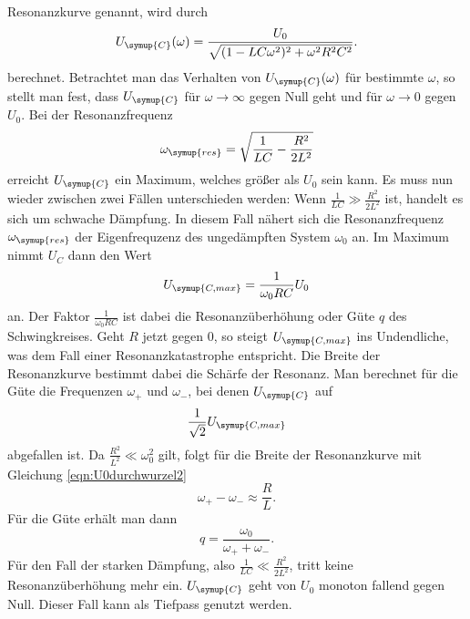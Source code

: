 Resonanzkurve genannt, wird durch
\begin{equation}
  U_\symup{C}(\omega) = \frac{U_0}{\sqrt{(1-L C \omega^2)^2 + \omega^2 R^2 C^2}}.
  \label{eqn:resonanzkurve}
\end{equation}
berechnet. Betrachtet man das Verhalten von $U_\symup{C}(\omega)$ für bestimmte
$\omega$, so stellt man fest, dass $U_\symup{C}$ für $\omega \to \infty$ gegen
Null geht und für $\omega \to 0$ gegen $U_0$. Bei der Resonanzfrequenz
\begin{equation}
  \omega_\symup{res} = \sqrt{\frac{1}{L C}-\frac{R^2}{2L^2}}
  \label{eqn:resonanzfrequenz}
\end{equation}
erreicht $U_\symup{C}$ ein Maximum, welches größer als $U_0$ sein kann.
Es muss nun wieder zwischen zwei Fällen unterschieden werden:\newline
Wenn $\frac{1}{L C} \gg \frac{R^2}{2 L^2}$ ist, handelt es sich um schwache Dämpfung.
In diesem Fall nähert sich die Resonanzfrequenz $\omega_\symup{res}$ der
Eigenfrequzenz des ungedämpften System $\omega_0$ an. Im Maximum nimmt
$U_C$ dann den Wert
\begin{equation}
  U_\symup{C,max} = \frac{1}{\omega_0 R C} U_0
  \label{eqn:Ucmax}
\end{equation}
an. Der Faktor $\frac{1}{\omega_0 R C}$ ist dabei die Resonanzüberhöhung oder
Güte $q$ des Schwingkreises. Geht $R$ jetzt gegen 0, so steigt $U_\symup{C,max}$
ins Undendliche, was dem Fall einer Resonanzkatastrophe entspricht.
Die Breite der Resonanzkurve bestimmt dabei die Schärfe der Resonanz. Man berechnet
für die Güte die Frequenzen $\omega_+$ und $\omega_-$, bei denen $U_\symup{C}$ auf
\begin{equation}
  \frac{1}{\sqrt{2}}U_\symup{C,max}
  \label{eqn:U0durchwurzel2}
\end{equation}
abgefallen ist.
Da $\frac{R^2}{L^2} \ll \omega_0^2$ gilt, folgt für die Breite der Resonanzkurve
mit Gleichung \eqref{eqn:U0durchwurzel2}
\begin{equation}
  \omega_+ - \omega_- \approx \frac{R}{L}.
  \label{eqn:breite_resonanzkurve}
\end{equation}
Für die Güte erhält man dann
\begin{equation}
  q = \frac{\omega_0}{\omega_+ + \omega_-}.
  \label{eqn:guete}
\end{equation}
Für den Fall der starken Dämpfung, also $\frac{1}{L C} \ll \frac{R^2}{2 L^2}$, tritt
keine Resonanzüberhöhung mehr ein. $U_\symup{C}$ geht von $U_0$ monoton fallend
gegen Null. Dieser Fall kann als Tiefpass genutzt werden.
\cite{sample}
